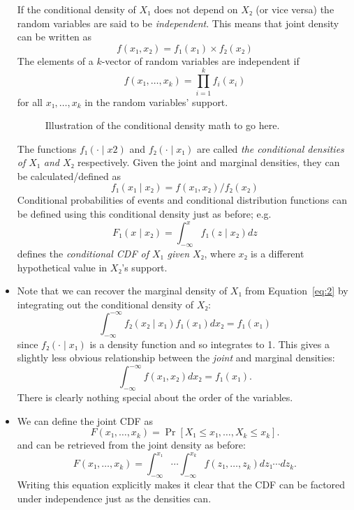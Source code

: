 \begin{itemize}
  If the conditional density of $X₁$ does not depend on $X₂$ (or vice
  versa) the random variables are said to be \emph{independent}.  This
  means that joint density can be written as
  \begin{equation*}
    f(x₁,x₂) = f₁(x₁) × f₂(x₂)
  \end{equation*}
  The elements of a $k$-vector of random variables are independent if
  \begin{equation*}
    f(x₁,…,x_k) = ∏_{i=1}^k f_i(x_i)
  \end{equation*}
  for all $x₁,…,x_k$ in the random variables' support.

\begin{figure}[t]
  [Empty for now.  Sometime soon, I'll add a figure.]
  \caption{Illustration of the conditional density math to go here.}
\end{figure}

  The functions $f₁(· ∣ x2)$ and $f₂(· ∣ x₁)$ are called \emph{the
  conditional densities of $X₁$ and $X₂$} respectively.  Given the
  joint and marginal densities, they can be calculated/defined as
  \begin{equation*}
    f₁(x₁ ∣ x₂) = f(x₁, x₂) / f₂(x₂)
  \end{equation*}
  Conditional probabilities of events and conditional distribution
  functions can be defined using this conditional density just as
  before; e.g.
  \begin{equation*}
    F₁(x ∣ x₂) = ∫_{-∞}^x f₁(z ∣ x₂) dz
  \end{equation*}
  defines the \emph{conditional CDF of $X₁$ given $X₂$}, where $x₂$ is
  a different hypothetical value in $X₂$'s support.

\item Note that we can recover the marginal density of $X₁$ from
  Equation~\eqref{eq:2} by integrating out the conditional density of
  $X₂$:
  \begin{equation*}
    ∫_{-∞}^{-∞} f₂(x₂ ∣ x₁) f₁(x₁) dx₂ = f₁(x₁)
  \end{equation*}
  since $f₂(· ∣ x₁)$ is a density function and so integrates to 1.
  This gives a slightly less obvious relationship between the
  \emph{joint} and marginal densities:
  \begin{equation*}
    ∫_{-∞}^{-∞} f(x₁, x₂) dx₂ = f₁(x₁).
  \end{equation*}
  There is clearly nothing special about the order of the variables.

\item We can define the joint CDF as
  \begin{equation*}
    F(x₁,…,x_k) = \Pr[X₁ ≤ x₁,…, X_k ≤ x_k].
  \end{equation*}
  and can be retrieved from the joint density as before:
  \begin{equation*}
    F(x₁,…,x_k) = ∫_{-∞}^{x₁} ⋯ ∫_{-∞}^{x_k} f(z₁,…,z_k) dz₁ ⋯ dz_k.
  \end{equation*}
  Writing this equation explicitly makes it clear that the CDF can be
  factored under independence just as the densities can.


\end{itemize}
